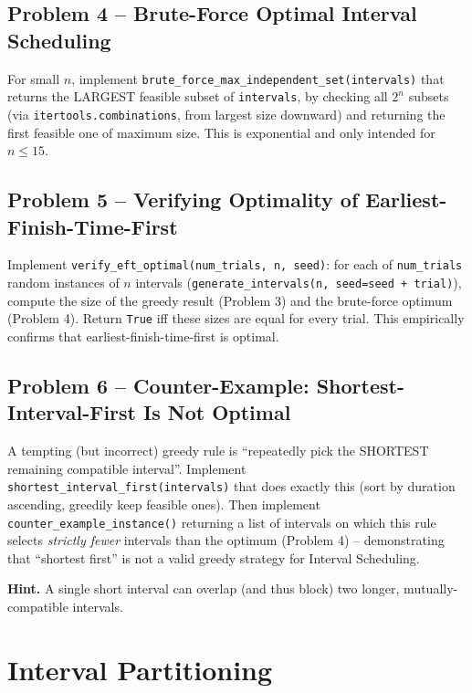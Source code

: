 \documentclass[11pt]{article}
\begin{document}
\subsection*{Problem 4 -- Brute-Force Optimal Interval Scheduling}

For small $n$, implement \texttt{brute\_force\_max\_independent\_set(intervals)} that
returns the LARGEST feasible subset of \texttt{intervals}, by checking all $2^n$ subsets
(via \texttt{itertools.combinations}, from largest size downward) and returning the first
feasible one of maximum size. This is exponential and only intended for $n \le 15$.

\subsection*{Problem 5 -- Verifying Optimality of Earliest-Finish-Time-First}

Implement \texttt{verify\_eft\_optimal(num\_trials, n, seed)}: for each of
\texttt{num\_trials} random instances of $n$ intervals (\texttt{generate\_intervals(n,
seed=seed + trial)}), compute the size of the greedy result (Problem 3) and the
brute-force optimum (Problem 4). Return \texttt{True} iff these sizes are equal for every
trial. This empirically confirms that earliest-finish-time-first is optimal.

\subsection*{Problem 6 -- Counter-Example: Shortest-Interval-First Is Not Optimal}

A tempting (but incorrect) greedy rule is ``repeatedly pick the SHORTEST remaining
compatible interval''. Implement \texttt{shortest\_interval\_first(intervals)} that does
exactly this (sort by duration ascending, greedily keep feasible ones). Then implement
\texttt{counter\_example\_instance()} returning a list of intervals on which this rule
selects \emph{strictly fewer} intervals than the optimum (Problem 4) -- demonstrating that
``shortest first'' is not a valid greedy strategy for Interval Scheduling.

\textbf{Hint.} A single short interval can overlap (and thus block) two longer,
mutually-compatible intervals.

\newpage
\section{Interval Partitioning}
\end{document}

